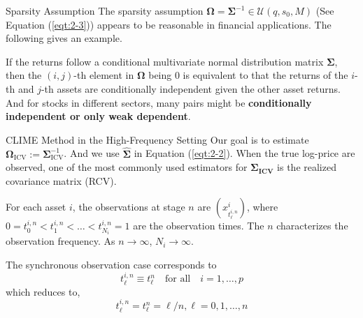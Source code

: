 \documentclass{beamer}
\begin{document}
\begin{frame}{Sparsity Assumption}
The sparsity assumption $\bm{\Omega} = \bm{\Sigma}^{-1} \in \mathcal{U}(q, s_0, M)$ (See Equation (\ref{eqt:2-3})) appears to be reasonable in financial applications. The following gives an example.\newline

If the returns follow a conditional multivariate normal distribution matrix $\bm{\Sigma}$, then the $(i,j)$-th element in $\bm{\Omega}$ being 0 is equivalent to that the returns of the $i$-th and $j$-th assets are conditionally independent given the other asset returns. And for stocks in different sectors, many pairs might be \textbf{conditionally independent or only weak dependent}.
\end{frame}

\begin{frame}{CLIME Method in the High-Frequency Setting}
Our goal is to estimate $\bm{\Omega}_{\text{ICV}}:= \bm{\Sigma}_{\text{ICV}}^{-1}$. And we use $\hat{\bm{\Sigma}}$ in Equation (\ref{eqt:2-2}). When the true log-price are observed, one of the most commonly used estimators for $\bm{\Sigma_{\text{ICV}}}$ is the realized covariance matrix (RCV).\newline

For each asset $i$, the observations at stage $n$ are $(x^i_{t_{\ell}^{i,n}})$, where $0 = t_{0}^{i,n}<t_{1}^{i,n}<\dots<t_{N_i}^{i,n} = 1$ are the observation times. The $n$ characterizes the observation frequency. As $n\to \infty$, $N_i\to \infty$.

The synchronous observation case corresponds to 
$$t_{\ell}^{i,n} \equiv t_{\ell}^n\quad \text{for all}\quad i = 1,\dots, p$$ 
which reduces to,
\begin{equation}
\label{eqt:2-4}
    t_{\ell}^{i,n} = t_{\ell}^n = \ell/n , \ell = 0,1,\dots,n
\end{equation}


\end{frame}
\end{document}
